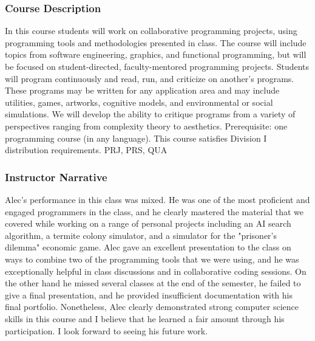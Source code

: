 
\subsubsection*{Course Description}
In this course students will work on collaborative programming projects,
using programming tools and methodologies presented in class. The course
will include topics from software engineering, graphics, and functional
programming, but will be focused on student-directed, faculty-mentored
programming projects. Students will program continuously and read, run,
and criticize on another's programs. These programs may be written
for any application area and may include utilities, games, artworks,
cognitive models, and environmental or social simulations. We will
develop the ability to critique programs from a variety of perspectives
ranging from complexity theory to aesthetics. Prerequisite: one
programming course (in any language). This course satisfies Division I
distribution requirements. PRJ, PRS, QUA

\subsubsection*{Instructor Narrative}
Alec's performance in this class was mixed. He was one of the most
proficient and engaged programmers in the class, and he clearly mastered
the material that we covered while working on a range of personal
projects including an AI search algorithm, a termite colony simulator,
and a simulator for the "prisoner's dilemma" economic game. Alec gave
an excellent presentation to the class on ways to combine two of the
programming tools that we were using, and he was exceptionally helpful
in class discussions and in collaborative coding sessions. On the other
hand he missed several classes at the end of the semester, he failed to
give a final presentation, and he provided insufficient documentation
with his final portfolio. Nonetheless, Alec clearly demonstrated strong
computer science skills in this course and I believe that he learned
a fair amount through his participation. I look forward to seeing his
future work.
